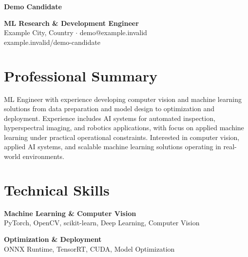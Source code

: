 \documentclass[11pt,a4paper]{article}
\newcommand{\role}[1]{
{\large\color{accent!70}\textbf{#1}}
}
\begin{document}

\begin{center}

{\Huge \bfseries \color{accent}Demo Candidate}

\role{ML Research \& Development Engineer} \\[0.5em]

{\scriptsize\color{black!70}
Example City, Country \quad $\cdot$ \quad
demo@example.invalid \\[0.2em]
example.invalid/demo-candidate
}

\end{center}

\vspace{0.5em}


\section*{\Large Professional Summary}

ML Engineer with experience developing computer vision and machine learning solutions from data preparation and model design to optimization and deployment. Experience includes AI systems for automated inspection, hyperspectral imaging, and robotics applications, with focus on applied machine learning under practical operational constraints. Interested in computer vision, applied AI systems, and scalable machine learning solutions operating in real-world environments.


\section*{\Large Technical Skills}

\textbf{Machine Learning \& Computer Vision} \\
PyTorch, OpenCV, scikit-learn, Deep Learning, Computer Vision

\vspace{0.4em}

\textbf{Optimization \& Deployment} \\
ONNX Runtime, TensorRT, CUDA, Model Optimization
\end{document}
